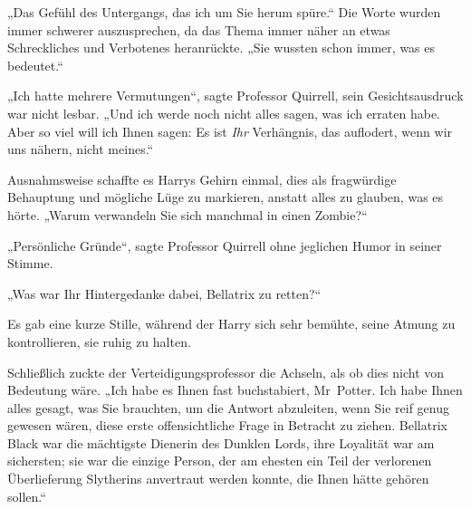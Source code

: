 „Das Gefühl des Untergangs, das ich um Sie herum spüre.“ Die Worte wurden immer schwerer auszusprechen, da das Thema immer näher an etwas Schreckliches und Verbotenes heranrückte. „Sie wussten schon immer, was es bedeutet.“

„Ich hatte mehrere Vermutungen“, sagte Professor Quirrell, sein Gesichtsausdruck war nicht lesbar. „Und ich werde noch nicht alles sagen, was ich erraten habe. Aber so viel will ich Ihnen sagen: Es ist \emph{Ihr} Verhängnis, das auflodert, wenn wir uns nähern, nicht meines.“

Ausnahmsweise schaffte es Harrys Gehirn einmal, dies als fragwürdige Behauptung und mögliche Lüge zu markieren, anstatt alles zu glauben, was es hörte. „Warum verwandeln Sie sich manchmal in einen Zombie?“

„Persönliche Gründe“, sagte Professor Quirrell ohne jeglichen Humor in seiner Stimme.

„Was war Ihr Hintergedanke dabei, Bellatrix zu retten?“

Es gab eine kurze Stille, während der Harry sich sehr bemühte, seine Atmung zu kontrollieren, sie ruhig zu halten.

Schließlich zuckte der Verteidigungsprofessor die Achseln, als ob dies nicht von Bedeutung wäre. „Ich habe es Ihnen fast buchstabiert, Mr~Potter. Ich habe Ihnen alles gesagt, was Sie brauchten, um die Antwort abzuleiten, wenn Sie reif genug gewesen wären, diese erste offensichtliche Frage in Betracht zu ziehen. Bellatrix Black war die mächtigste Dienerin des Dunklen Lords, ihre Loyalität war am sichersten; sie war die einzige Person, der am ehesten ein Teil der verlorenen Überlieferung Slytherins anvertraut werden konnte, die Ihnen hätte gehören sollen.“

